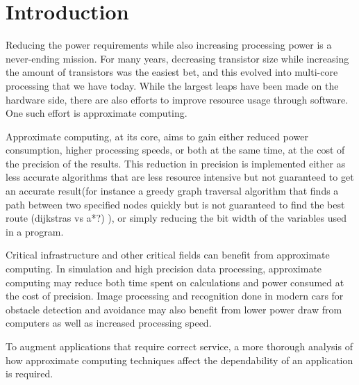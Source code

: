 \section{Introduction}



Reducing the power requirements while also increasing processing power is a never-ending mission. For many years, decreasing transistor size while increasing the amount of transistors was the easiest bet, and this evolved into multi-core processing that we have today. While the largest leaps have been made on the hardware side, there are also efforts to improve resource usage through software. One such effort is approximate computing. 

Approximate computing, at its core, aims to gain either reduced power consumption, higher processing speeds, or both at the same time, at the cost of the precision of the results. This reduction in precision is implemented either as less accurate algorithms that are less resource intensive but not guaranteed to get an accurate result(for instance a greedy graph traversal algorithm that finds a path between two specified nodes quickly but is not guaranteed to find the best route (dijkstras vs a*?) ), or simply reducing the bit width of the variables used in a program.

Critical infrastructure and other critical fields can benefit from approximate computing. In simulation and high precision data processing, approximate computing may reduce both time spent on calculations and power consumed at the cost of precision. Image processing and recognition done in modern cars for obstacle detection and avoidance may also benefit from lower power draw from computers as well as increased processing speed.

To augment applications that require correct service, a more thorough analysis of how approximate computing techniques affect the dependability of an application is required.

